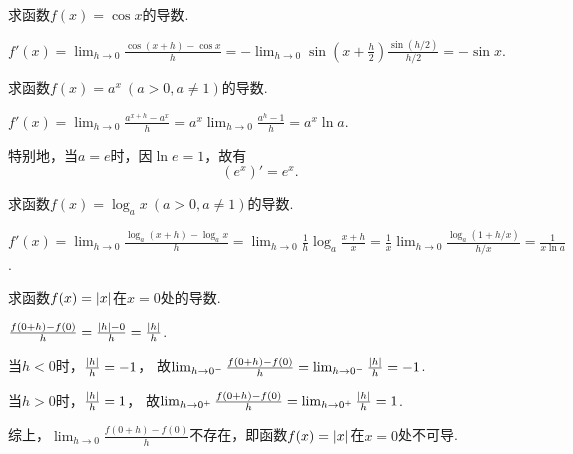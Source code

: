 \begin{example}%
求函数\(f(x) = \cos x\)的导数.
\begin{solution}
\(f'(x) = \lim_{h\to0} \frac{\cos(x+h)-\cos x}{h}
= - \lim_{h\to0} \sin\left(x+\frac{h}2\right) \frac{\sin(h/2)}{h/2}
= - \sin x\).
\end{solution}
\end{example}

\begin{example}%
求函数\(f(x) = a^x\ (a>0,a\neq1)\)的导数.
\begin{solution}
\(f'(x)
= \lim_{h\to0}\frac{a^{x+h}-a^x}{h}
= a^x \lim_{h\to0}\frac{a^h-1}{h}
= a^x \ln a\).
\end{solution}
\end{example}
\begin{remark}
特别地，当\(a=e\)时，因\(\ln e = 1\)，故有\begin{equation*}
	(e^x)' = e^x.
\end{equation*}
\end{remark}

\begin{example}%
求函数\(f(x) = \log_a x\ (a>0,a\neq1)\)的导数.
\begin{solution}
\(f'(x)
= \lim_{h\to0}\frac{\log_a(x+h)-\log_a x}{h}
= \lim_{h\to0}{\frac{1}{h} \log_a\frac{x+h}{x}}
= \frac{1}{x} \lim_{h\to0}\frac{\log_a(1+h/x)}{h/x}
= \frac{1}{x \ln a}\).
\end{solution}
\end{example}

\begin{example}
求函数\(f(x) = \abs{x}\)在\(x=0\)处的导数.
\begin{solution}
\(\frac{f(0+h)-f(0)}{h} = \frac{\abs{h}-0}{h} = \frac{\abs{h}}{h}\).

当\(h < 0\)时，\(\frac{\abs{h}}{h} = -1\)，
故\(\lim_{h\to0^-}\frac{f(0+h)-f(0)}{h}
= \lim_{h\to0^-}\frac{\abs{h}}{h} = -1\).

当\(h > 0\)时，\(\frac{\abs{h}}{h} = 1\)，
故\(\lim_{h\to0^+}\frac{f(0+h)-f(0)}{h}
= \lim_{h\to0^+}\frac{\abs{h}}{h} = 1\).

综上，\(\lim_{h\to0}\frac{f(0+h)-f(0)}{h}\)不存在，即函数\(f(x) = \abs{x}\)在\(x = 0\)处不可导.
\end{solution}
\end{example}

